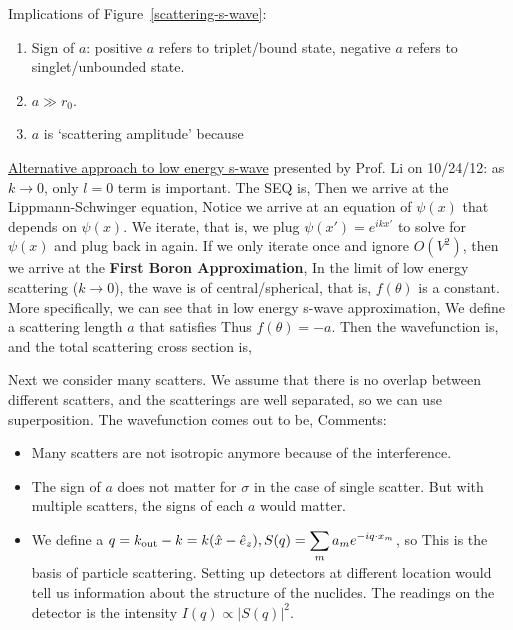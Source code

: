 \documentclass{school-22.101-notes}
\begin{document}
\begin{enumerate}
Implications of Figure~\ref{scattering-s-wave}:
\begin{enumerate}
\item Sign of $a$:  positive $a$ refers to triplet/bound state, negative $a$ refers to singlet/unbounded state. 
\item $a \gg r_0$. 
\item $a$ is `scattering amplitude' because 
\end{enumerate}
\end{enumerate}

\uline{Alternative approach to low energy s-wave} presented by Prof. Li on 10/24/12: as $k\to 0$, only $l=0$ term is important. The SEQ is, 
Then we arrive at the Lippmann-Schwinger equation, 
Notice we arrive at an equation of $\psi(x)$ that depends on $\psi(x)$. We iterate, that is, we plug $\psi(x') = e^{ikx'}$ to solve for $\psi(x)$ and plug back in again. If we only iterate once and ignore $O(V^2)$, then we arrive at the \textbf{First Boron Approximation}, 
In the limit of low energy scattering ($k \to 0$), the wave is of central/spherical, that is, $f(\theta)$ is a constant. More specifically, we can see that in low energy s-wave approximation, 
We define a scattering length $a$ that satisfies 
Thus $f(\theta) = -a$. Then the wavefunction is, 
and the total scattering cross section is,


Next we consider many scatters. We assume that there is no overlap between different scatters, and the scatterings are well separated, so we can use superposition. The wavefunction comes out to be,
Comments: 
\begin{itemize}
\item Many scatters are not isotropic anymore because of the interference. 
\item The sign of $a$ does not matter for $\sigma$ in the case of single scatter. But with multiple scatters, the signs of each $a$ would matter. 
\item We define a $\displaystyle q = k_{\mathrm{out}} - k = k(\hat{x} - \hat{e}_z), S(q) = \displaystyle\sum_m a_m e^{-i q \cdot x_m}$, so 
  This is the basis of particle scattering. Setting up detectors at different location would tell us information about the structure of the nuclides. The readings on the detector is the intensity $I(q) \propto |S(q)|^2$. 
\end{itemize}
\end{document}
